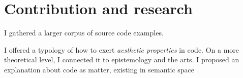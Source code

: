 

\section{Contribution and research}

I gathered a larger corpus of source code examples.

I offered a typology of how to exert \emph{aesthetic properties} in code. On a more theoretical level, I connected it to epistemology and the arts.
I proposed an explanation about code as matter, existing in semantic space


